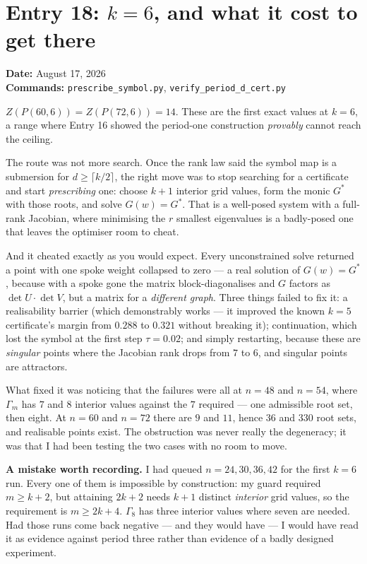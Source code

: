 \documentclass[12pt]{article}
\begin{document}
\clearpage
\section*{Entry 18: $k=6$, and what it cost to get there}
\textbf{Date:} August 17, 2026\\
\textbf{Commands:} {\small\texttt{prescribe\_symbol.py},
\texttt{verify\_period\_d\_cert.py}}

$Z(P(60,6))=Z(P(72,6))=14$. These are the first exact values at $k=6$, a range
where Entry 16 showed the period-one construction \emph{provably} cannot
reach the ceiling.

The route was not more search. Once the rank law said the symbol map is a
submersion for $d\ge\lceil k/2\rceil$, the right move was to stop searching for
a certificate and start \emph{prescribing} one: choose $k+1$ interior grid
values, form the monic $G^\ast$ with those roots, and solve $G(w)=G^\ast$. That
is a well-posed system with a full-rank Jacobian, where minimising the $r$
smallest eigenvalues is a badly-posed one that leaves the optimiser room to
cheat.

And it cheated exactly as you would expect. Every unconstrained solve returned
a point with one spoke weight collapsed to zero --- a real solution of
$G(w)=G^\ast$, because with a spoke gone the matrix block-diagonalises and $G$
factors as $\det U\cdot\det V$, but a matrix for a \emph{different graph}.
Three things failed to fix it: a realisability barrier (which demonstrably
works --- it improved the known $k=5$ certificate's margin from $0.288$ to
$0.321$ without breaking it); continuation, which lost the symbol at the first
step $\tau=0.02$; and simply restarting, because these are \emph{singular}
points where the Jacobian rank drops from $7$ to $6$, and singular points are
attractors.

What fixed it was noticing that the failures were all at $n=48$ and $n=54$,
where $\Gamma_m$ has $7$ and $8$ interior values against the $7$ required ---
one admissible root set, then eight. At $n=60$ and $n=72$ there are $9$ and
$11$, hence $36$ and $330$ root sets, and realisable points exist. The
obstruction was never really the degeneracy; it was that I had been testing
the two cases with no room to move.

\textbf{A mistake worth recording.} I had queued $n=24,30,36,42$ for the first
$k=6$ run. Every one of them is impossible by construction: my guard required
$m\ge k+2$, but attaining $2k+2$ needs $k+1$ distinct \emph{interior} grid
values, so the requirement is $m\ge2k+4$. $\Gamma_8$ has three interior values
where seven are needed. Had those runs come back negative --- and they would
have --- I would have read it as evidence against period three rather than
evidence of a badly designed experiment.
\end{document}
